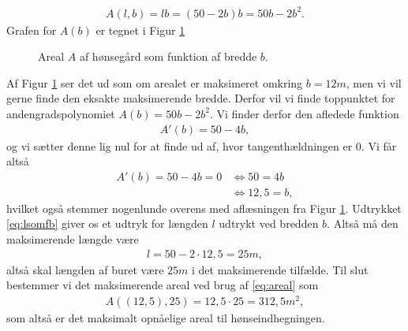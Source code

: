 \begin{exa}
\begin{align*}
A(l,b) = lb = (50-2b)b = 50b-2b^2.
\end{align*}
Grafen for $A(b)$ er tegnet i Figur \ref{fig:honsegraf}
\begin{figure}[H]
	\centering
	\caption{Areal $A$ af hønsegård som funktion af bredde $b$.}
	\label{fig:honsegraf}
\end{figure}

Af Figur \ref{fig:honsegraf} ser det ud som om arealet er maksimeret omkring $b=12m$, men vi vil gerne finde den eksakte maksimerende bredde. Derfor vil vi finde toppunktet for andengradspolynomiet $A(b) = 50b-2b^2$. Vi finder derfor den afledede funktion
\begin{align*}
A'(b) = 50-4b,
\end{align*}
og vi sætter denne lig nul for at finde ud af, hvor tangenthældningen er $0$. Vi får altså
\begin{align*}
A'(b) = 50-4b = 0 &\Leftrightarrow 50=4b\\
&\Leftrightarrow 12,5=b,
\end{align*}
hvilket også stemmer nogenlunde overens med aflæsningen fra Figur \ref{fig:honsegraf}. Udtrykket \eqref{eq:lsomfb} giver os et udtryk for længden $l$ udtrykt ved bredden $b$. Altså må den maksimerende længde være 
\begin{align*}
l = 50-2\cdot 12,5 = 25m,
\end{align*}
altså skal længden af buret være $25m$ i det maksimerende tilfælde. Til slut bestemmer vi det maksimerende areal ved brug af \eqref{eq:areal} som
\begin{align*}
A((12,5),25) = 12,5\cdot25 = 312,5m^2,
\end{align*}
som altså er det maksimalt opnåelige areal til hønseindhegningen. 
\end{exa}
